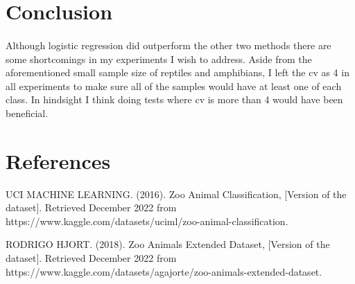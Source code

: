 \documentclass{article}
\begin{document}
\section{Conclusion}
\paragraph{}
    Although logistic regression did outperform the other two methods there are some shortcomings in my experiments I wish to address. Aside from the aforementioned small sample size of reptiles and amphibians, I left the cv as 4 in all experiments to make sure all of the samples would have at least one of each class. In hindsight I think doing tests where cv is more than 4 would have been beneficial. 
\label{headings}

\section*{References}

{
\small

UCI MACHINE LEARNING. (2016). Zoo Animal Classification, [Version of the dataset]. Retrieved December 2022 from https://www.kaggle.com/datasets/uciml/zoo-animal-classification.

RODRIGO HJORT. (2018). Zoo Animals Extended Dataset, [Version of the dataset]. Retrieved December 2022 from https://www.kaggle.com/datasets/agajorte/zoo-animals-extended-dataset.


}
\end{document}

